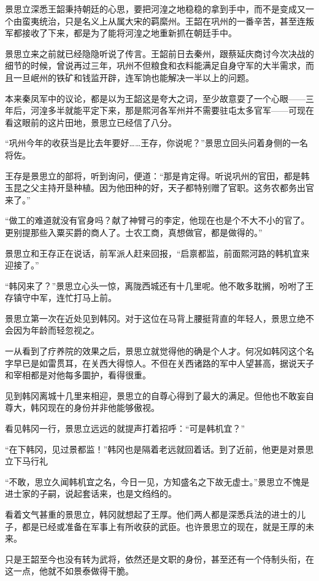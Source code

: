 景思立深悉王韶秉持朝廷的心思，要把河湟之地稳稳的拿到手中，而不是变成又一个由蛮夷统治，只是名义上从属大宋的羁縻州。王韶在巩州的一番辛苦，甚至连叛军都接收了下来，都是为了能将河湟之地重新抓在朝廷手中。

景思立来之前就已经隐隐听说了传言。王韶前日去秦州，跟蔡延庆商讨今次决战的细节的时候，曾说再过三年，巩州不但粮食和衣料能满足自身守军的大半需求，而且一旦岷州的铁矿和钱监开辟，连军饷也能解决一半以上的问题。

本来秦凤军中的议论，都是以为王韶这是夸大之词，至少故意耍了一个心眼——三年后，河湟多半就能平定下来，那是熙河各军州并不需要驻屯太多官军——可现在看这眼前的这片田地，景思立已经信了八分。

“巩州今年的收获当是比去年要好……王存，你说呢？”景思立回头问着身侧的一名将佐。

王存是景思立的部将，听到询问，便道：“那是肯定得。听说巩州的官田，都是韩玉昆之父主持开垦种植。因为他田种的好，天子都特别赠了官职。这务农都务出官来了。”

“做工的难道就没有官身吗？献了神臂弓的李定，他现在也是个不大不小的官了。更别提那些入粟买爵的商人了。士农工商，真想做官，都是做得的。”

景思立和王存正在说话，前军派人赶来回报，“启禀都监，前面熙河路的韩机宜来迎接了。”

“韩冈来了？”景思立心头一惊，离陇西城还有十几里呢。他不敢多耽搁，吩咐了王存镇守中军，连忙打马上前。

景思立第一次在近处见到韩冈。对于这位在马背上腰挺背直的年轻人，景思立绝不会因为年龄而轻忽视之。

一从看到了疗养院的效果之后，景思立就觉得他的确是个人才。何况如韩冈这个名字早已是如雷贯耳，在关西大得惊人。不但在关西诸路的军中人望甚高，据说天子和宰相都是对他每多圜护，看得很重。

见到韩冈离城十几里来相迎，景思立的自尊心得到了最大的满足。但他也不敢妄自尊大，韩冈现在的身份并非他能够傲视。

看见韩冈一行，景思立远远的就提声打着招呼：“可是韩机宜？”

“在下韩冈，见过景都监！”韩冈也是隔着老远就回着话。到了近前，他更是对景思立下马行礼

“不敢，思立久闻韩机宜之名，今日一见，方知盛名之下故无虚士。”景思立不愧是进士家的子嗣，说起套话来，也是文绉绉的。

看着文气甚重的景思立，韩冈就想起了王厚。他们两人都是深悉兵法的进士的儿子，都是已经或准备在军事上有所收获的武臣。也许景思立的现在，就是王厚的未来。

只是王韶至今也没有转为武将，依然还是文职的身份，甚至还有一个侍制头衔，在这一点，他就不如景泰做得干脆。

